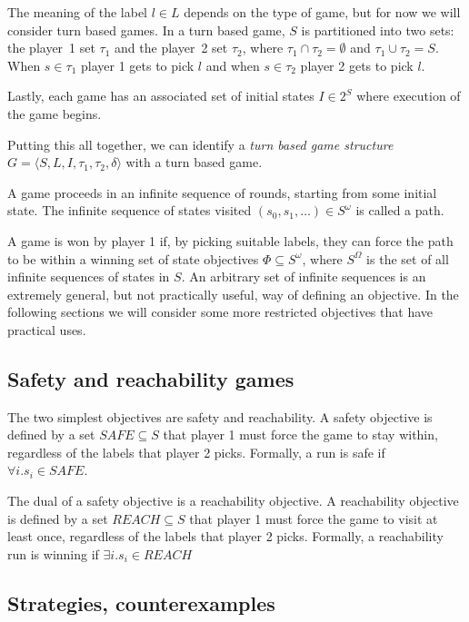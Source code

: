 \documentclass[a4paper,twoside,openright,11pt]{book}
\theoremstyle{definition}
\begin{document}
The meaning of the label $l \in L$ depends on the type of game, but for now we will consider turn based games. In a turn based game, $S$ is partitioned into two sets: the player~1 set $\tau_1$ and the player~2 set $\tau_2$, where $\tau_1 \cap \tau_2 = \emptyset$ and $ \tau_1 \cup \tau_2 = S$. When $s \in \tau_1$ player 1 gets to pick $l$ and when $s \in \tau_2$ player 2 gets to pick $l$.

Lastly, each game has an associated set of initial states $I \in 2^S$ where execution of the game begins.

Putting this all together, we can identify a \emph{turn based game structure} $G = \langle S,L,I,\tau_1,\tau_2,\delta \rangle$ with a turn based game.

A game proceeds in an infinite sequence of rounds, starting from some initial state. The infinite sequence of states visited $(s_0, s_1,\ldots) \in S^\omega$ is called a path. 

A game is won by player 1 if, by picking suitable labels, they can force the path to be within a winning set of state objectives $\Phi \subseteq S^\omega$, where $S^\Omega$ is the set of all infinite sequences of states in $S$. An arbitrary set of infinite sequences is an extremely general, but not practically useful, way of defining an objective. In the following sections we will consider some more restricted objectives that have practical uses.

\subsection{Safety and reachability games}

The two simplest objectives are safety and reachability. A safety objective is defined by a set $SAFE \subseteq S$ that player 1 must force the game to stay within, regardless of the labels that player 2 picks. Formally, a run is safe if $\forall i. s_i \in SAFE$. 

The dual of a safety objective is a reachability objective. A reachability objective is defined by a set $REACH \subseteq S$ that player 1 must force the game to visit at least once, regardless of the labels that player 2 picks. Formally, a reachability run is winning if $\exists i. s_i \in REACH$

\subsection{Strategies, counterexamples}
\end{document}
